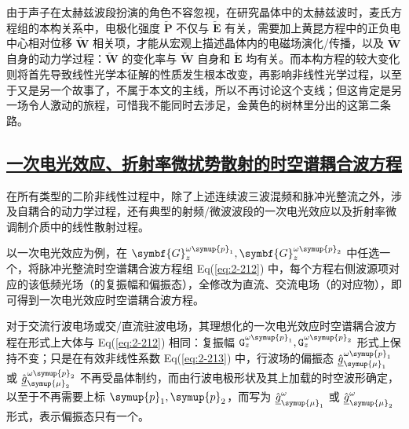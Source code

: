 由于声子在太赫兹波段扮演的角色不容忽视，在研究晶体中的太赫兹波时，麦氏方程组的本构关系中，电极化强度 $\widetilde{\symbf P}$ 不仅与 $\widetilde{\symbf E}$ 有关，需要加上黄昆方程中的正负电中心相对位移 $\widetilde{\symbf W}$ 相关项，才能从宏观上描述晶体内的电磁场演化/传播，以及 $\widetilde{\symbf W}$ 自身的动力学过程：$\widetilde{\symbf W}$ 的变化率与 $\widetilde{\symbf W}$ 自身和 $\widetilde{\symbf E}$ 均有关。而本构方程的较大变化则将首先导致线性光学本征解的性质发生根本改变，再影响非线性光学过程，以至于又是另一个故事了，不属于本文的主线，所以不再讨论这个支线；但这肯定是另一场令人激动的旅程，可惜我不能同时去涉足，金黄色的树林里分出的这第二条路。

\subsection{\protect\hyperlink{chap:\thesubsection}{一次电光效应、折射率微扰势散射的时空谱耦合波方程}}
\label{一次电光效应、折射率微扰势散射的时空谱耦合波方程}

在所有类型的二阶非线性过程中，除了上述连续波三波混频和脉冲光整流之外，涉及自耦合的动力学过程，还有典型的射频/微波波段的一次电光效应以及折射率微调制介质中的线性散射过程。

以一次电光效应为例，在 ${\symbf{G}}^{\omega{\symup{p}}_{1}}_{z}, {\symbf{G}}^{\omega{\symup{p}}_{2}}_{z}$ 中任选一个，将脉冲光整流时空谱耦合波方程组 Eq(\ref{eq:2-212}) 中，每个方程右侧波源项对应的该低频光场（的复振幅和偏振态），全修改为直流、交流电场（的对应物），即可得到一次电光效应时空谱耦合波方程。

对于交流行波电场或交/直流驻波电场，其理想化的一次电光效应时空谱耦合波方程在形式上大体与 Eq(\ref{eq:2-212}) 相同：复振幅 ${\mathtt{G}}^{\omega{\symup{p}}_{1}}_{z}, {\mathtt{G}}^{\omega{\symup{p}}_{2}}_{z}$ 形式上保持不变；只是在有效非线性系数 Eq(\ref{eq:2-213}) 中，行波场的偏振态 $\hat{\underline{g}}^{\omega\symup{p}_{1}}_{{\symup{\mu}}_1}$ 或 $\hat{\underline{g}}^{\omega\symup{p}_{2}}_{{\symup{\mu}}_2}$ 不再受晶体制约，而由行波电极形状及其上加载的时空波形确定，以至于不再需要上标 $\symup{p}_{1}, \symup{p}_{2}$，而写为 $\hat{\underline{g}}^{\omega}_{{\symup{\mu}}_1}$ 或 $\hat{\underline{g}}^{\omega}_{{\symup{\mu}}_2}$ 形式，表示偏振态只有一个。

